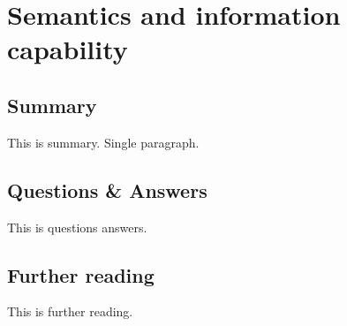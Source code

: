 \section{Semantics and information capability}

\subsection{Summary}
This is summary. Single paragraph.

\subsection{Questions \& Answers}
This is questions answers.

\subsection{Further reading}
This is further reading.
